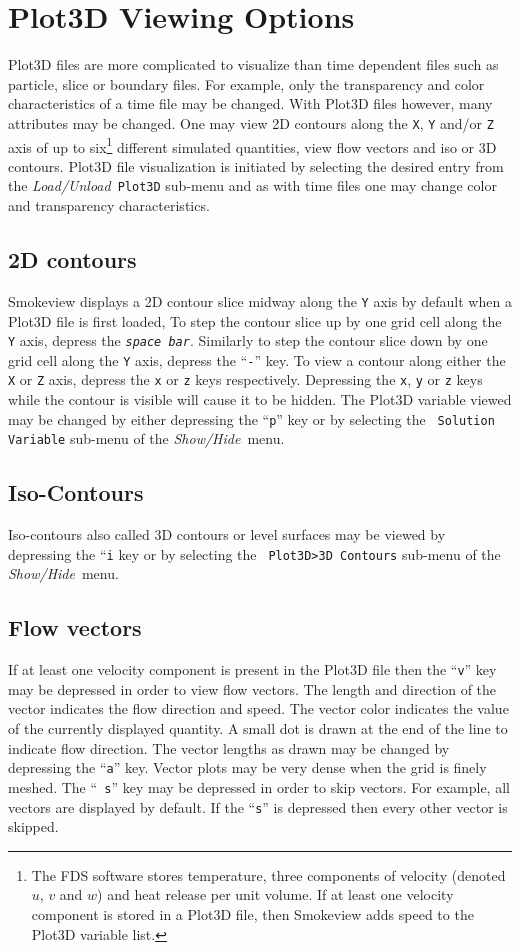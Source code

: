 \documentclass[11pt,twoside]{book}
\begin{document}
\section{Plot3D Viewing Options} Plot3D files are more
complicated to visualize than time dependent files such as
particle, slice or boundary files. For example, only the
transparency and color characteristics of a time file may be
changed. With Plot3D files however, many attributes may be
changed. One may view 2D contours along the {\tt X}, {\tt Y}
and/or {\tt Z} axis of up to six\footnote{ The FDS software stores
temperature, three components of velocity (denoted $u$, $v$ and
$w$) and heat release per unit volume.  If at least one velocity
component is stored in a Plot3D file, then Smokeview adds speed to
the Plot3D variable list.} different simulated quantities, view
flow vectors and iso or 3D contours. Plot3D file visualization is
initiated by selecting the desired entry from the {\em
Load/Unload}\ {\tt Plot3D} sub-menu and as with time files one may
change color and transparency characteristics.

\subsection{2D contours}
Smokeview displays a 2D contour slice midway along the {\tt Y}
axis by default when a Plot3D file is first loaded, To step the
contour slice up by one grid cell along the {\tt Y} axis, depress
the {\em\tt space bar}. Similarly to step the contour slice down
by one grid cell along the {\tt Y} axis, depress the ``{\tt -}''
key. To view a contour along either the {\tt X} or {\tt Z} axis,
depress the {\tt x} or {\tt z} keys respectively.  Depressing the
{\tt x}, {\tt y} or {\tt z} keys while the contour is visible will
cause it to be hidden. The Plot3D variable viewed may be changed
by either depressing the ``{\tt p}'' key or by selecting the {\tt
Solution Variable} sub-menu of the {\em Show/Hide}\ menu.

\subsection{Iso-Contours}Iso-contours also called 3D contours or level surfaces may be
viewed by depressing the ``{\tt i} key or by selecting the {\tt
Plot3D>3D Contours} sub-menu of the {\em Show/Hide}\ menu.

\subsection{Flow vectors}If at least one velocity component is present in the Plot3D
file then the ``{\tt v}'' key may be depressed in order to view
flow  vectors. The length and direction of the vector indicates
the flow direction and speed. The vector color indicates the value
of the currently displayed quantity. A small dot is drawn at the
end of the line to indicate flow direction. The vector lengths as
drawn may be changed by depressing the ``{\tt a}'' key. Vector
plots may be very dense when the grid is finely meshed. The ``{\tt
s}'' key may be depressed in order to skip vectors.  For example,
all vectors are displayed by default.  If the ``{\tt s}'' is
depressed then every other vector is skipped.
\end{document}
